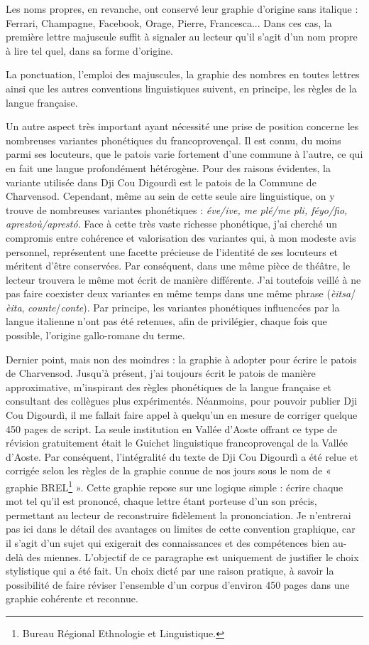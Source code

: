 Les noms propres, en revanche, ont conservé leur graphie d'origine sans italique : Ferrari, Champagne, Facebook, Orage, Pierre, Francesca... Dans ces cas, la première lettre majuscule suffit à signaler au lecteur qu’il s’agit d’un nom propre à lire tel quel, dans sa forme d’origine.

La ponctuation, l'emploi des majuscules, la graphie des nombres en toutes lettres ainsi que les autres conventions linguistiques sui\-vent, en principe, les règles de la langue française.

Un autre aspect très important ayant nécessité une prise de position concerne les nombreuses variantes phonétiques du francoprovençal. Il est connu, du moins parmi ses locuteurs, que le patois varie fortement d’une commune à l’autre, ce qui en fait une langue profondément hétérogène. Pour des raisons évidentes, la variante utilisée dans Dji Cou Digourdì est le patois de la Commune de Charvensod. Cependant, même au sein de cette seule aire linguistique, on y trouve de nombreuses variantes phonétiques : \textit{éve/ive, me plé/me pli, féyo/fio, aprestoù/aprestó}. Face à cette très vaste richesse phonétique, j'ai cherché un compromis entre cohérence et valorisation des variantes qui, à mon modeste avis personnel, représentent une facette précieuse de l'identité de ses locuteurs et méritent d’être conservées. Par conséquent, dans une même pièce de théâtre, le lecteur trouvera le même mot écrit de manière différente. J’ai toutefois veillé à ne pas faire coexister deux variantes en même temps dans une même phrase (\textit{èitsa}/\textit{èita}, \textit{counte}/\textit{conte}). Par principe, les variantes phonétiques influencées par la langue italienne n'ont pas été retenues, afin de privilégier, chaque fois que possible, l'origine gallo-romane du terme.

Dernier point, mais non des moindres : la graphie à adopter pour écrire le patois de Charvensod. Jusqu’à présent, j'ai toujours écrit le patois de manière approximative, m'inspirant des règles phonétiques de la langue française et consultant des collègues plus expérimentés. Néanmoins, pour pouvoir publier Dji Cou Digourdì, il me fallait faire appel à quelqu’un en mesure de corriger quelque 450 pages de script. La seule institution en Vallée d'Aoste offrant ce type de révision gratuitement était le Guichet linguistique francoprovençal de la Vallée d'Aoste. Par conséquent, l'intégralité du texte de Dji Cou Digourdì a été relue et corrigée selon les règles de la graphie connue de nos jours sous le nom de « graphie BREL\footnote{ Bureau Régional Ethnologie et Linguistique.} ». Cette graphie repose sur une logique simple : écrire chaque mot tel qu’il est prononcé, chaque lettre étant porteuse d’un son précis, permettant au lecteur de reconstruire fidèlement la prononciation. Je n'entrerai pas ici dans le détail des avantages ou limites de cette convention graphique, car il s'agit d'un sujet qui exigerait des connaissances et des compétences bien au-delà des miennes. L'objectif de ce paragraphe est uniquement de justifier le choix stylistique qui a été fait. Un choix dicté par une raison pratique, à savoir la possibilité de faire réviser l’ensemble d’un corpus d'environ 450 pages dans une graphie cohérente et reconnue.


